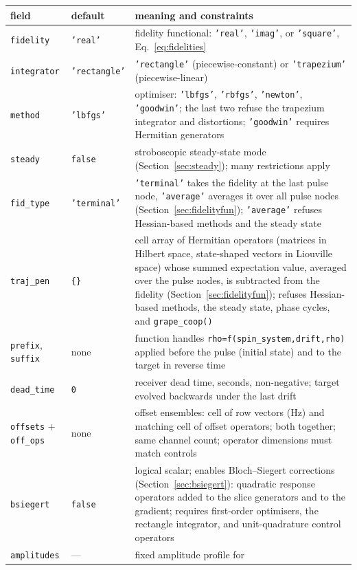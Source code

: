 \documentclass[11pt,a4paper]{article}
\newcommand{\code}[1]{\texttt{#1}}
\begin{document}
\begin{longtable}{lp{2.6cm}p{7.6cm}}
\toprule
field & default & meaning and constraints\\
\midrule
\endhead
\code{fidelity} & \code{'real'} & fidelity functional:
\code{'real'}, \code{'imag'}, or \code{'square'},
Eq.~\eqref{eq:fidelities}\\
\code{integrator} & \code{'rectangle'} & \code{'rectangle'}
(piecewise-constant) or \code{'trapezium'} (piecewise-linear)\\
\code{method} & \code{'lbfgs'} & optimiser: \code{'lbfgs'},
\code{'rbfgs'}, \code{'newton'}, \code{'goodwin'}; the last two refuse
the trapezium integrator and distortions; \code{'goodwin'} requires
Hermitian generators\\
\code{steady} & \code{false} & stroboscopic steady-state mode
(Section~\ref{sec:steady}); many restrictions apply\\
\code{fid\_type} & \code{'terminal'} & \code{'terminal'} takes the
fidelity at the last pulse node, \code{'average'} averages it over all
pulse nodes (Section~\ref{sec:fidelityfun}); \code{'average'} refuses
Hessian-based methods and the steady state\\
\code{traj\_pen} & \code{\{\}} & cell array of Hermitian operators
(matrices in Hilbert space, state-shaped vectors in Liouville space)
whose summed expectation value, averaged over the pulse nodes, is
subtracted from the fidelity (Section~\ref{sec:fidelityfun}); refuses
Hessian-based methods, the steady state, phase cycles, and
\code{grape\_coop()}\\
\code{prefix}, \code{suffix} & none & function handles
\code{rho=f(spin\_system,drift,rho)} applied before the pulse (initial
state) and to the target in reverse time\\
\code{dead\_time} & \code{0} & receiver dead time, seconds,
non-negative; target evolved backwards under the last drift\\
\code{offsets} + \code{off\_ops} & none & offset ensembles: cell of row
vectors (Hz) and matching cell of offset operators; both together;
same channel count; operator dimensions must match controls\\
\code{bsiegert} & \code{false} & logical scalar; enables
Bloch--Siegert corrections (Section~\ref{sec:bsiegert}): quadratic
response operators added to the slice generators and to the gradient;
requires first-order optimisers, the rectangle integrator, and
unit-quadrature control operators\\
\code{amplitudes} & --- & fixed amplitude profile for

\end{longtable}
\end{document}
